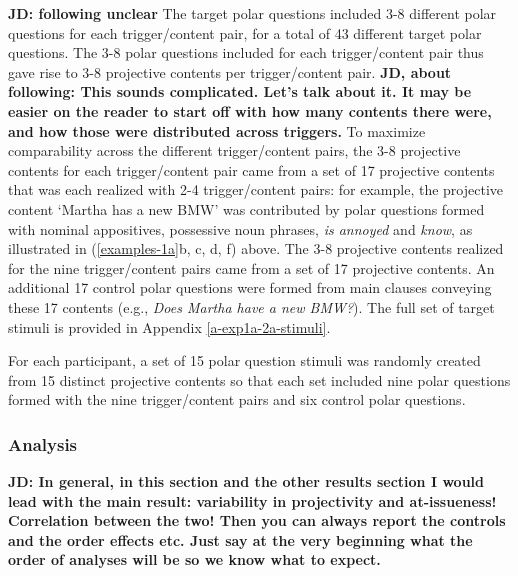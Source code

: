 \documentclass[11pt,fleqn]{article}
\newcommand{\6}{\mbox{$[\hspace*{-.6mm}[$}}
\newcommand{\9}{\mbox{$]\hspace*{-.6mm}]$}}
\begin{document}
{\bf JD: following unclear} The target polar questions included 3-8 different polar questions for each trigger/content pair, for a total of 43 different target polar questions. The 3-8 polar questions included for each trigger/content pair thus gave rise to 3-8 projective contents per trigger/content pair. {\bf JD, about following: This sounds complicated. Let’s talk about it. It may be easier on the reader to start off with how many contents there were, and how those were distributed across triggers.} To maximize comparability across the different trigger/content pairs, the 3-8 projective contents for each trigger/content pair came from a set of 17 projective contents that was each realized with 2-4 trigger/content pairs: for example, the projective content `Martha has a new BMW' was contributed by polar questions formed with nominal appositives, possessive noun phrases, {\em is annoyed} and {\em know}, as illustrated in (\ref{examples-1a}b, c, d, f) above. The 3-8 projective contents realized for the nine trigger/content pairs came from a set of 17 projective contents. An additional 17 control polar questions were formed from main clauses conveying these 17 contents (e.g., {\em Does Martha have a new BMW?}). The full set of target stimuli is provided in Appendix \ref{a-exp1a-2a-stimuli}.

    
For each participant, a set of 15 polar question stimuli was randomly created from 15 distinct projective contents so that each set included nine polar questions formed with the nine trigger/content pairs and six control polar questions.




\subsubsection{Analysis}

{\bf JD: In general, in this section and the other results section I would lead with the main result: variability in projectivity and at-issueness! Correlation between the two! Then you can always report the controls and the order effects etc. Just say at the very beginning what the order of analyses will be so we know what to expect.}
\end{document}
